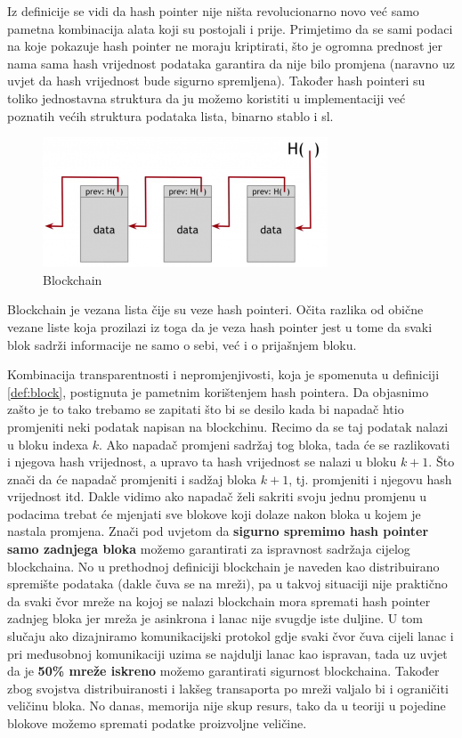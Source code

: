 \documentclass[a4paper,oneside,12pt]{memoir} %
\begin{document}
Iz definicije se vidi da hash pointer nije ništa revolucionarno novo već samo pametna kombinacija alata koji su postojali i prije. Primjetimo da se sami podaci na koje pokazuje hash pointer ne moraju kriptirati, što je ogromna prednost jer nama sama hash vrijednost podataka garantira da nije bilo promjena (naravno uz uvjet da hash vrijednost bude sigurno spremljena). Također hash pointeri su toliko jednostavna struktura da ju možemo koristiti u implementaciji već poznatih većih struktura podataka lista, binarno stablo i sl.

\begin{figure}[!]
\centering
\includegraphics[scale=0.9]{blockchain}
\caption{Blockchain}
\label{fig:blockchain}
\end{figure}

Blockchain je vezana lista čije su veze hash pointeri. Očita razlika od obične vezane liste koja prozilazi iz toga da je veza hash pointer jest u tome da svaki blok sadrži informacije ne samo o sebi, već i o prijašnjem bloku. 

Kombinacija transparentnosti i nepromjenjivosti, koja je spomenuta u definiciji \ref{def:block}, postignuta je pametnim korištenjem hash pointera. Da objasnimo zašto je to tako trebamo se zapitati što bi se desilo kada bi napadač htio promjeniti neki podatak napisan na blockchinu. Recimo da se taj podatak nalazi u bloku indexa $k$. Ako napadač promjeni sadržaj tog bloka, tada će se razlikovati i njegova hash vrijednost, a upravo ta hash vrijednost se nalazi u bloku $k+1$. Što znači da će napadač promjeniti i sadžaj bloka $k+1$, tj. promjeniti i njegovu hash vrijednost itd. Dakle vidimo ako napadač želi sakriti svoju jednu promjenu u podacima trebat će mjenjati sve blokove koji dolaze nakon bloka u kojem je nastala promjena. Znači pod uvjetom da \textbf{sigurno spremimo hash pointer samo zadnjega bloka} možemo garantirati za ispravnost sadržaja cijelog blockchaina. No u prethodnoj definiciji blockchain je naveden kao distribuirano spremište podataka (dakle čuva se na mreži), pa u takvoj situaciji nije praktično da svaki čvor mreže na kojoj se nalazi blockchain mora spremati hash pointer zadnjeg bloka jer mreža je asinkrona i lanac nije svugdje iste duljine. U tom slučaju ako dizajniramo komunikacijski protokol gdje svaki čvor čuva cijeli lanac i pri međusobnoj komunikaciji uzima se najdulji lanac kao ispravan, tada uz uvjet da je \textbf{50\% mreže iskreno} možemo garantirati sigurnost blockchaina. Također zbog svojstva distribuiranosti i lakšeg transaporta po mreži valjalo bi i ograničiti veličinu bloka. No danas, memorija nije skup resurs, tako da u teoriji u pojedine blokove možemo spremati podatke proizvoljne veličine.
\end{document}
